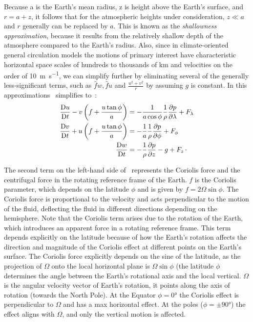 Because a is the Earth's mean radius, z is height above the Earth's surface, and
$r = a + z$, it follows that for the atmospheric heights under consideration, $z \ll a$ and
$r$ generally can be replaced by $a$. This is known as the \emph{shallowness
	approximation}, because it results from the relatively shallow depth of the atmosphere
compared to the Earth's radius.
Also, since in climate-oriented general circulation
models the motions of primary interest have characteristic horizontal space scales of
hundreds to thousands of \unit{\kilo\meter} and velocities on the order of \qty{10}{\meter\per\second}, we can simplify
\eq{\ref{eq:momentum-eq-atm}} further by eliminating several of the generally less-significant terms,
such as $\hat{f}w, \hat{f}u$ and $\frac{u^2+v^2}{r}$ by assuming $g$ is constant.
In this approximations~\eq{\ref{eq:momentum-eq-atm}} simplifies to~\citep{Washington2005}:
\begin{subequations}
	\begin{align}
		\frac{\mathrm{D} u}{\mathrm{D}t} - v\left(f +  \frac{u \tan{\phi}}{a}\right) & = -\frac{1}{ a \cos{\phi}}\frac{1}{\rho}\frac{\partial p}{\partial \lambda} + F_\lambda \label{eq:momentum-shallow-u} \\
		\frac{\mathrm{D} v}{\mathrm{D}t} + u\left( f + \frac{u \tan{\phi}}{a}\right) & = -\frac{1}{a}\frac{1}{\rho}\frac{\partial p}{\partial \phi}  + F_\phi   \label{eq:momentum-shallow-v}                \\
		\frac{\mathrm{D} w}{\mathrm{D}t}                                             & = -\frac{1}{\rho }\frac{\partial p}{\partial z} -g  + F_z  \, \cdot \label{eq:momentum-shallow-w}
	\end{align}
	\label{eq:momentum-eq-atm-shallow}
\end{subequations}

The second term on the left-hand side of~\eq{\ref{eq:momentum-shallow-u}} represents the Coriolis force and the centrifugal force in the rotating reference frame of the Earth.
$f$ is the Coriolis parameter, which depends on the latitude $\phi$ and is given by $f=2\Omega\sin\phi$.
The Coriolis force is proportional to the velocity and acts perpendicular to the motion of the fluid, deflecting the
fluid in different directions depending on the hemisphere.
Note that the Coriolis term arises due to the rotation of the Earth, which introduces an apparent force in a rotating reference frame.
This term depends explicitly on the latitude because of how the Earth's rotation affects the direction and magnitude of the Coriolis
effect at different points on the Earth's surface.
The Coriolis force explicitly depends on the sine of the latitude, as the projection of $\Omega$ onto the local horizontal plane is
$\Omega\sin\phi$ (the latitude $\phi$ determines the angle between the Earth's rotational axis and the local vertical.
$\Omega$ is the angular velocity vector of Earth's rotation, it points along the axis of rotation (towards the North Pole). At the Equator $\phi=0°$ the Coriolis effect is perpendicular to $\Omega$ and has a max horizontal effect. At the poles ($\phi=\pm 90°$) the effect aligns with $\Omega$, and only the vertical motion is affected.

